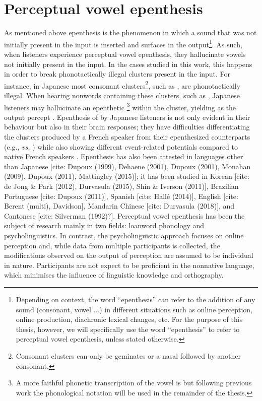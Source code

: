 \section{Perceptual vowel epenthesis}

As mentioned above epenthesis is the phenomenon in which a sound that was not initially present in the input is inserted and surfaces in the output\footnote{Depending on context, the word ``epenthesis'' can refer to the addition of any sound (consonant, vowel ...) in different situations such as online perception, online production, diachronic lexical changes, etc. For the purpose of this thesis, however, we will specifically use the word ``epenthesis'' to refer to perceptual vowel epenthesis, unless stated otherwise.}. As such, when listeners experience perceptual vowel epenthesis, they hallucinate vowels not initially present in the input. In the cases studied in this work, this happens in order to break phonotactically illegal clusters present in the input. For instance, in Japanese most consonant clusters\footnote{Consonant clusters can only be geminates or a nasal followed by another consonant.}, such as , are phonotactically illegal. When hearing nonwords containing these clusters, such as , Japanese listeners may hallucinate an epenthetic \footnote{A more faithful phonetic transcription of the vowel is \textipa{[W]} but following previous work the phonological notation  will be used in the remainder of the thesis.} within the cluster, yielding  as the output percept \cite{dupoux1999}. Epenthesis of  by Japanese listeners is not only evident in their behaviour but also in their brain responses; they have difficulties differentiating the clusters produced by a French speaker from their epenthesized counterparts (e.g.,  \textit{vs.} ) while also showing different event-related potentials compared to native French speakers \cite{dehaene2000}.
Epenthesis has also been attested in languages other than Japanese [cite: Dupoux (1999), Dehaene (2001), Dupoux (2001), Monahan (2009), Dupoux (2011), Mattingley (2015)]; it has been studied in Korean [cite: de Jong \& Park (2012), Durvasula (2015), Shin \& Iverson (2011)], Brazilian Portuguese [cite: Dupoux (2011)], Spanish [cite: Hallé (2014)], English [cite: Berent (multi), Davidson], Mandarin Chinese [cite: Durvasula (2018)], and Cantonese [cite: Silverman (1992)?]. 
Perceptual vowel epenthesis has been the subject of research mainly in two fields: loanword phonology and psycholinguistics.  In contrast, the psycholinguistic approach focuses on online perception and, while data from multiple participants is collected, the modifications observed on the output of perception are assumed to be individual in nature. Participants are not expect to be proficient in the nonnative language, which minimises the influence of linguistic knowledge and orthography. 

